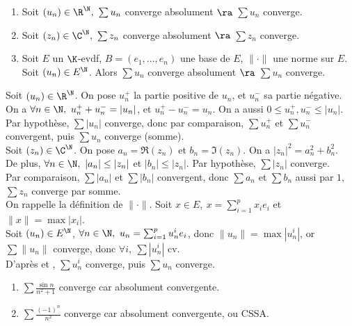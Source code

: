 \documentclass[11pt]{article}
\begin{document}
\begin{prop}{}{}
    \begin{enumerate}
        \item Soit $(u_n)\in\R^\N, ~ \sum u_n$ converge absolument $\ra$ $\sum u_n$ converge.
        \item Soit $(z_n)\in\C^\N, ~ \sum z_n$ converge absolument $\ra$ $\sum z_n$ converge.
        \item Soit $E$ un $\K$-evdf, $B=(e_1,...,e_n)$ une base de $E$, $\|\cdot\|$ une norme sur $E$.\\
        Soit $(u_n)\in E^\N$. Alors $\sum u_n$ converge absolument $\ra$ $\sum u_n$ converge.
    \end{enumerate}
    \tcblower
     Soit $(u_n)\in\R^\N$. On pose $u_n^+$ la partie positive de $u_n$, et $u_n^-$ sa partie négative.\\
    On a $\forall n \in \N, ~ u_n^+ + u_n^- = |u_n|$, et $u_n^+-u_n^-=u_n$. On a aussi $0\leq u_n^+,u_n^- \leq |u_n|$.\\
    Par hypothèse, $\sum |u_n|$ converge, donc par comparaison, $\sum u_n^+$ et $\sum u_n^-$ convergent, puis $\sum u_n$ converge (somme).\\
     Soit $(z_n)\in\C^\N$. On pose $a_n=\Re(z_n)$ et $b_n=\Im(z_n)$. On a $|z_n|^2=a_n^2+b_n^2$.\\
    De plus, $\forall n \in \N, ~ |a_n|\leq|z_n|$ et $|b_n|\leq|z_n|$. Par hypothèse, $\sum|z_n|$ converge.\\
    Par comparaison, $\sum |a_n|$ et $\sum |b_n|$ convergent, donc $\sum a_n$ et $\sum b_n$ aussi par $\boxed{1}$, $\sum z_n$ converge par somme.\\
     On rappelle la définition de $\|\cdot\|$. Soit $x\in E, ~ x = \sum_{i=1}^px_ie_i$ et $\|x\|=\max|x_i|$.\\
    Soit $(u_n)\in E^\N$, $\forall n \in \N, ~ u_n = \sum_{i=1}^pu_n^ie_i$, donc $\|u_n\|=\max|u_n^i|$, or $\sum\|u_n\|$ converge, donc $\forall i, ~ \sum|u_n^i|$ cv.\\
    D'après  et , $\sum u_n^i$ converge, puis $\sum u_n$ converge.
\end{prop}

\begin{ex}{}{}
    \begin{enumerate}
        \item $\sum \frac{\sin n}{n^2+1}$ converge car absolument convergente.
        \item $\sum\frac{(-1)^n}{n^2}$ converge car absolument convergente, ou CSSA.
    \end{enumerate}
\end{ex}
\end{document}
